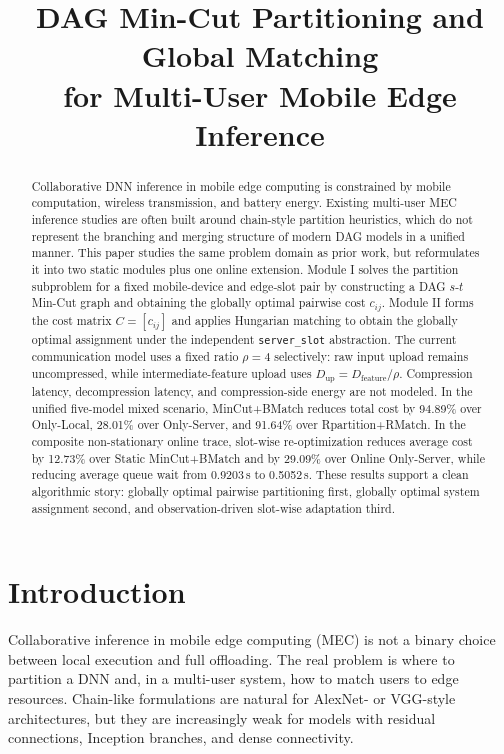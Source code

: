 \documentclass[conference]{IEEEtran}
\title{DAG Min-Cut Partitioning and Global Matching\\
for Multi-User Mobile Edge Inference}
\author{\IEEEauthorblockN{Anonymous Authors}}
\begin{document}
\maketitle

\begin{abstract}
Collaborative DNN inference in mobile edge computing is constrained by mobile
computation, wireless transmission, and battery energy. Existing multi-user MEC
inference studies are often built around chain-style partition heuristics,
which do not represent the branching and merging structure of modern DAG models
in a unified manner. This paper studies the same problem domain as prior work,
but reformulates it into two static modules plus one online extension. Module I
solves the partition subproblem for a fixed mobile-device and edge-slot pair by
constructing a DAG $s$-$t$ Min-Cut graph and obtaining the globally optimal
pairwise cost $c_{ij}$. Module II forms the cost matrix $C=[c_{ij}]$ and
applies Hungarian matching to obtain the globally optimal assignment under the
independent \texttt{server\_slot} abstraction. The current communication model
uses a fixed ratio $\rho=4$ selectively: raw input upload remains uncompressed,
while intermediate-feature upload uses $D_{\text{up}}=D_{\text{feature}}/\rho$.
Compression latency, decompression latency, and compression-side energy are not
modeled. In the unified five-model mixed scenario, MinCut+BMatch reduces total
cost by 94.89\% over Only-Local, 28.01\% over Only-Server, and 91.64\% over
Rpartition+RMatch. In the composite non-stationary online trace, slot-wise
re-optimization reduces average cost by 12.73\% over Static MinCut+BMatch and
by 29.09\% over Online Only-Server, while reducing average queue wait from
0.9203\,s to 0.5052\,s. These results support a clean algorithmic story:
globally optimal pairwise partitioning first, globally optimal system
assignment second, and observation-driven slot-wise adaptation third.
\end{abstract}

\section{Introduction}

Collaborative inference in mobile edge computing (MEC) is not a binary choice
between local execution and full offloading. The real problem is where to
partition a DNN and, in a multi-user system, how to match users to edge
resources. Chain-like formulations are natural for AlexNet- or VGG-style
architectures, but they are increasingly weak for models with residual
connections, Inception branches, and dense connectivity.
\end{document}
